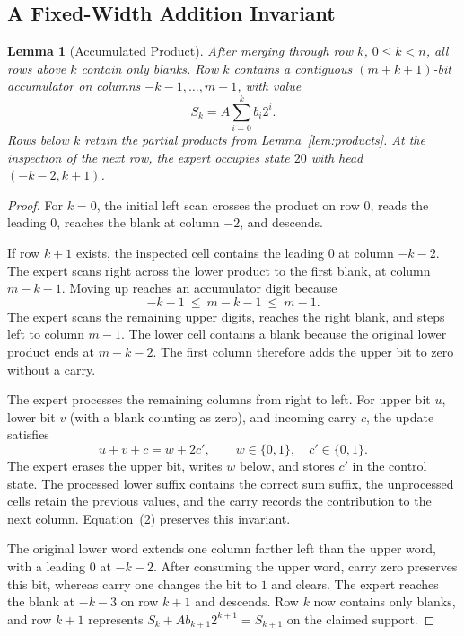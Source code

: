 \documentclass[11pt,a4paper]{article}
\newtheorem{lemma}{Lemma}
\begin{document}
\subsection{A Fixed-Width Addition Invariant}\label{sec:part2}
\begin{lemma}[Accumulated Product]\label{lem:merge}
After merging through row $k$, $0\le k<n$, all rows above $k$ contain only blanks.
Row $k$ contains a contiguous $(m+k+1)$-bit accumulator on columns
$-k-1,\ldots,m-1$, with value
\[
S_k=A\sum_{i=0}^{k}b_i2^i.
\]
Rows below $k$ retain the partial products from Lemma~\ref{lem:products}.
At the inspection of the next row, the expert occupies state $20$ with head
$(-k-2,k+1)$.
\end{lemma}
\begin{proof}
For $k=0$, the initial left scan crosses the product on row $0$, reads the
leading $0$, reaches the blank at column $-2$, and descends.

If row $k+1$ exists, the inspected cell contains the leading $0$ at column
$-k-2$. The expert scans right across the lower product to the first blank,
at column $m-k-1$. Moving up reaches an accumulator digit because
\[
-k-1\ \le\ m-k-1\ \le\ m-1.
\]
The expert scans the remaining upper digits, reaches the right blank, and
steps left to column $m-1$. The lower cell contains a blank because the
original lower product ends at $m-k-2$. The first column therefore adds
the upper bit to zero without a carry.

The expert processes the remaining columns from right to left. For upper
bit $u$, lower bit $v$ (with a blank counting as zero), and incoming carry
$c$, the update satisfies
\[
u+v+c=w+2c',\qquad w\in\{0,1\},\quad c'\in\{0,1\}. \tag{2}
\]
The expert erases the upper bit, writes $w$ below, and stores $c'$ in the
control state. The processed lower suffix contains the correct sum suffix,
the unprocessed cells retain the previous values, and the carry records
the contribution to the next column. Equation~(2) preserves this invariant.

The original lower word extends one column farther left than the upper word,
with a leading $0$ at $-k-2$. After consuming the upper word, carry zero
preserves this bit, whereas carry one changes the bit to $1$ and clears.
The expert reaches the blank at $-k-3$ on row $k+1$ and descends.
Row $k$ now contains only blanks, and row $k+1$ represents
$S_k+A b_{k+1}2^{k+1}=S_{k+1}$ on the claimed support.
\end{proof}
\end{document}

